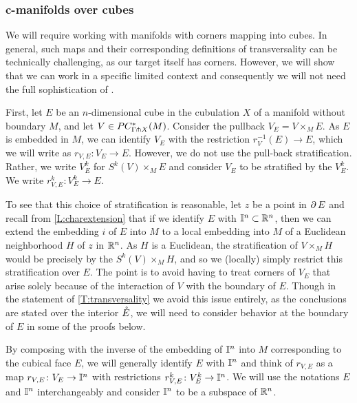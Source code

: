 \medskip



\subsubsection{c-manifolds over cubes}\label{reductiontocubes}
We will require working with manifolds with corners mapping into cubes.
In general, such maps and their corresponding definitions of transversality can be technically challenging, as our target itself has corners.
However, we will show that we can work in a specific limited context and consequently we will not need the full sophistication of \cite{Joy12}.

First, let $E$ be an $n$-dimensional cube in the cubulation $X$ of a manifold without boundary $M$, and let $V \in PC_{\Gamma \pitchfork X}^*(M)$.
Consider the pullback $V_E = V \times_M E$.
As $E$ is embedded in $M$, we can identify $V_E$ with the restriction $r_V^{-1}(E) \to E$, which we will write as $r_{V,E} \colon V_E \to E$.
However, we do not use the pull-back stratification. Rather, we write $V_E^k$ for $S^k(V) \times_M E$ and consider $V_E$ to be stratified by the $V_E^k$.
We write $r_{V,E}^k \colon V_E^k \to E$.

To see that this choice of stratification is reasonable, let $z$ be a point in $\operatorname{\partial} E$ and recall from \cref{L:charextension} that if we identify $E$ with $\mathbb{I}^n \subset \mathbb{R}^n$, then we can extend the embedding $i$ of $E$ into $M$ to a local embedding into $M$ of a Euclidean neighborhood $H$ of $z$ in $\mathbb{R}^n$.
As $H$ is a Euclidean, the stratification of $V \times_M H$ would be precisely by the $S^k(V) \times_M H$, and so we (locally) simply restrict this stratification over $E$.
The point is to avoid having to treat corners of $V_E$ that arise solely because of the interaction of $V$ with the boundary of $E$.
Though in the statement of \cref{T:transversality} we avoid this issue entirely, as the conclusions are stated over the interior $\mathring{E}$, we will need to consider behavior at the boundary of $E$ in some of the proofs below.

By composing with the inverse of the embedding of $\mathbb{I}^n$ into $M$ corresponding to the cubical face $E$, we will generally identify $E$ with $\mathbb{I}^n$ and think of $r_{V,E}$ as a map $r_{V,E} \colon V_E \to \mathbb{I}^n$ with restrictions $r_{V,E}^k \colon V_E^k \to \mathbb{I}^n$.
We will use the notations $E$ and $\mathbb{I}^n$ interchangeably and consider $\mathbb{I}^n$ to be a subspace of $\mathbb{R}^n$.

